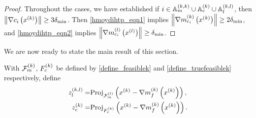 \begin{proof}



Throughout the cases, we have established if $i \in {\mathbb A_m^{(k, k)}} \cup {\mathbb A_c^{(k)}} \cup {\mathbb A_l^{(k, l)}}$, then $\left\| \nabla c_i\left(x^{(k)}\right) \right\| \ge 3 {\delta_{\textrm{min}}}$.
Then \cref{hmoydihtp_eqn1} implies $\left\|{\nabla m_{c_i}^{(k)}\left(x^{(k)}\right)}\right\| \ge 2 {\delta_{\textrm{min}}}$, 
and \cref{hmoydihtp_eqn2} implies $\left\|{\nabla m_{c_i}^{(l)}\left({x^{(l)}}\right)}\right\| \ge {\delta_{\textrm{min}}}$.
\end{proof}

% 
% 


We are now ready to state the main result of this section.   

With ${\mathcal F_m^{(k)}}$, ${F_c^{(k)}}$ be defined by \cref{define_feasiblek} and \cref{define_truefeasiblek} respectively, define
\begin{align}
{z_l^{(k, l)}} =& {\textrm{Proj}}_{{\mathcal F_m^{(l)}}}\left(x^{(k)} - {\nabla m_f^{(k)}\left(x^{(k)}\right)}\right), \label{define_zlk} \\
{z_c^{(k)}} =& {\textrm{Proj}}_{{F_c^{(k)}}}\left(x^{(k)} - {\nabla m_f^{(k)}\left(x^{(k)}\right)}\right). \label{define_zck}
\end{align}



